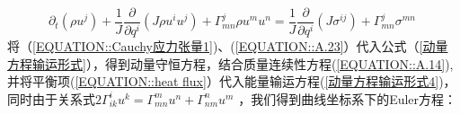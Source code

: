\documentclass[LBMDerivation.tex]{subfiles}
\begin{document}
\begin{equation}
  \boxed{
    \partial_{t}\left(\rho u^{j}\right)+\frac{1}{J} \frac{\partial}{\partial q^{i}}\left(J \rho u^{i} u^{j} \right)+\Gamma_{mn}^{j} \rho u^{m} u^{n}
    = \frac{1}{J} \frac{\partial}{\partial q^{i}}\left(J \sigma^{ij} \right) + \Gamma_{mn}^{j} \sigma^{mn} }
  \label{动量方程输运} ~
\end{equation}
%
将（\ref{EQUATION::Cauchy应力张量1})、(\ref{EQUATION::A.23}）代入公式（\ref{动量方程输运形式}），得到动量守恒方程，结合质量连续性方程(\ref{EQUATION::A.14}), 并将平衡项(\ref{EQUATION::heat flux}）代入能量输运方程(\ref{动量方程输运形式4})，同时由于关系式$2\Gamma_{ik}^i u^k = \Gamma_{mn}^m u^n + \Gamma_{nm}^n u^m$
，我们得到曲线坐标系下的Euler方程：





\end{document}
